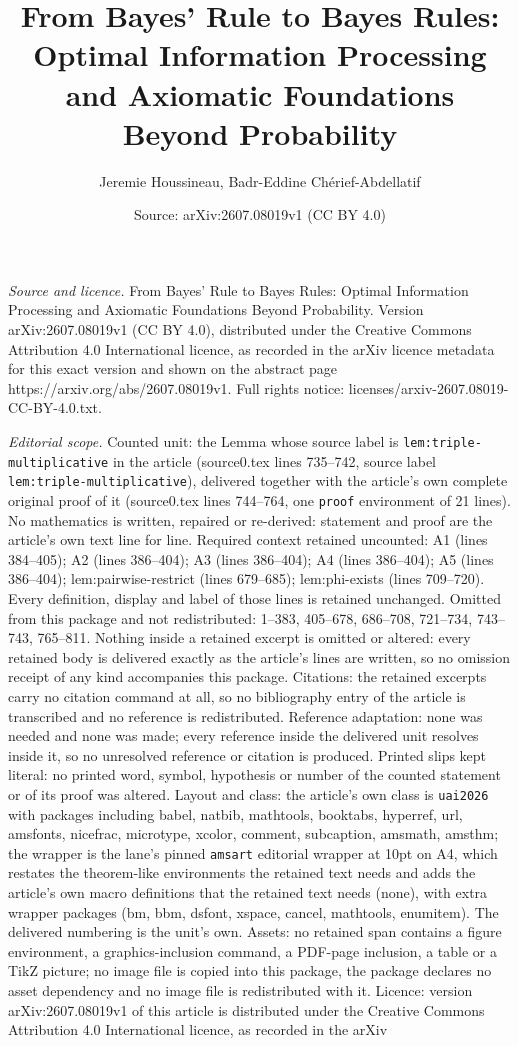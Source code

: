 \documentclass[10pt,a4paper]{amsart}
\title[From Bayes' Rule to Bayes Rules: Optimal Information Process]{From Bayes' Rule to Bayes Rules: Optimal Information Processing and Axiomatic Foundations Beyond Probability}
\author{Jeremie Houssineau, Badr-Eddine Ch\'erief-Abdellatif}
\date{Source: arXiv:2607.08019v1 (CC BY 4.0)}
\begin{document}
\maketitle

\noindent\emph{Source and licence.} From Bayes' Rule to Bayes Rules: Optimal Information Processing and Axiomatic Foundations Beyond Probability. Version arXiv:2607.08019v1 (CC BY 4.0), distributed under the Creative Commons Attribution 4.0 International licence, as recorded in the arXiv licence metadata for this exact version and shown on the abstract page https://arxiv.org/abs/2607.08019v1. Full rights notice: licenses/arxiv-2607.08019-CC-BY-4.0.txt.\par\smallskip

\noindent\textit{Editorial scope.} Counted unit: the Lemma whose source label is \texttt{lem:triple-multiplicative} in the article (source0.tex lines 735--742, source label \texttt{lem:triple-multiplicative}), delivered together with the article's own complete original proof of it (source0.tex lines 744--764, one \texttt{proof} environment of 21 lines). No mathematics is written, repaired or re-derived: statement and proof are the article's own text line for line. Required context retained uncounted: A1 (lines 384--405); A2 (lines 386--404); A3 (lines 386--404); A4 (lines 386--404); A5 (lines 386--404); lem:pairwise-restrict (lines 679--685); lem:phi-exists (lines 709--720). Every definition, display and label of those lines is retained unchanged. Omitted from this package and not redistributed: 1--383, 405--678, 686--708, 721--734, 743--743, 765--811. Nothing inside a retained excerpt is omitted or altered: every retained body is delivered exactly as the article's lines are written, so no omission receipt of any kind accompanies this package. Citations: the retained excerpts carry no citation command at all, so no bibliography entry of the article is transcribed and no reference is redistributed. Reference adaptation: none was needed and none was made; every reference inside the delivered unit resolves inside it, so no unresolved reference or citation is produced. Printed slips kept literal: no printed word, symbol, hypothesis or number of the counted statement or of its proof was altered. Layout and class: the article's own class is \texttt{uai2026} with packages including babel, natbib, mathtools, booktabs, hyperref, url, amsfonts, nicefrac, microtype, xcolor, comment, subcaption, amsmath, amsthm; the wrapper is the lane's pinned \texttt{amsart} editorial wrapper at 10pt on A4, which restates the theorem-like environments the retained text needs and adds the article's own macro definitions that the retained text needs (none), with extra wrapper packages (bm, bbm, dsfont, xspace, cancel, mathtools, enumitem). The delivered numbering is the unit's own. Assets: no retained span contains a figure environment, a graphics-inclusion command, a PDF-page inclusion, a table or a TikZ picture; no image file is copied into this package, the package declares no asset dependency and no image file is redistributed with it. Licence: version arXiv:2607.08019v1 of this article is distributed under the Creative Commons Attribution 4.0 International licence, as recorded in the arXiv 
\end{document}
